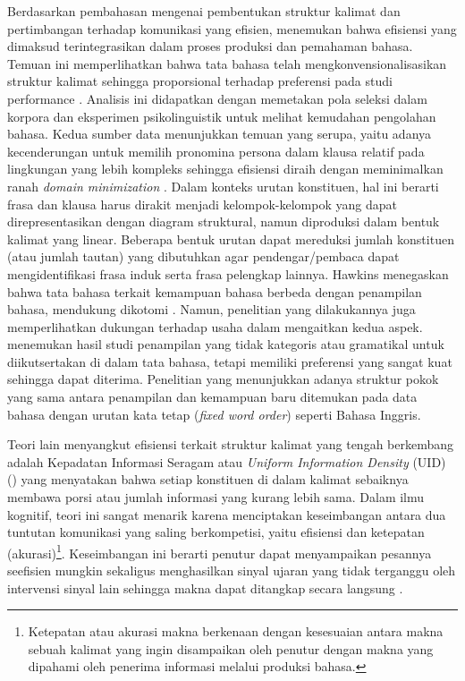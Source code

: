 Berdasarkan pembahasan mengenai pembentukan struktur kalimat dan pertimbangan terhadap komunikasi yang efisien, \cite{hawkins2004efficiency} menemukan bahwa efisiensi yang dimaksud terintegrasikan dalam proses produksi dan pemahaman bahasa. Temuan ini memperlihatkan bahwa tata bahasa telah mengkonvensionalisasikan struktur kalimat sehingga proporsional terhadap preferensi pada studi performance \citep{hawkins2004efficiency}. Analisis ini didapatkan dengan memetakan pola seleksi dalam korpora dan eksperimen psikolinguistik untuk melihat kemudahan pengolahan bahasa. Kedua sumber data menunjukkan temuan yang serupa, yaitu adanya kecenderungan untuk memilih pronomina persona dalam klausa relatif pada lingkungan yang lebih kompleks sehingga efisiensi diraih dengan meminimalkan ranah \textit{domain minimization} \citep{hawkins2004efficiency}. Dalam konteks urutan konstituen, hal ini berarti frasa dan klausa harus dirakit menjadi kelompok-kelompok yang dapat direpresentasikan dengan diagram struktural, namun diproduksi dalam bentuk kalimat yang linear. Beberapa bentuk urutan dapat mereduksi jumlah konstituen (atau jumlah tautan) yang dibutuhkan agar pendengar/pembaca dapat mengidentifikasi frasa induk serta frasa pelengkap lainnya. Hawkins menegaskan bahwa tata bahasa terkait kemampuan bahasa berbeda dengan penampilan bahasa, mendukung dikotomi \cite{chomsky1965syntactic}. Namun, penelitian yang dilakukannya juga memperlihatkan dukungan terhadap usaha dalam mengaitkan kedua aspek. \cite{hawkins2004efficiency} menemukan hasil studi penampilan yang tidak kategoris atau gramatikal untuk diikutsertakan di dalam tata bahasa, tetapi memiliki preferensi yang sangat kuat sehingga dapat diterima. Penelitian \cite{hawkins2004efficiency} yang menunjukkan adanya struktur pokok yang sama antara penampilan dan kemampuan baru ditemukan pada data bahasa dengan urutan kata tetap (\textit{fixed word order}) seperti Bahasa Inggris. 

Teori lain menyangkut efisiensi terkait struktur kalimat yang tengah berkembang adalah Kepadatan Informasi Seragam atau \textit{Uniform Information Density} (UID) (\citealp{jaeger2007speakers, frank2008speaking}) yang menyatakan bahwa setiap konstituen di dalam kalimat  sebaiknya membawa porsi atau jumlah informasi yang kurang lebih sama. Dalam ilmu kognitif, teori ini sangat menarik karena menciptakan keseimbangan antara dua tuntutan komunikasi yang saling berkompetisi, yaitu efisiensi dan ketepatan (akurasi)\footnote{Ketepatan atau akurasi makna berkenaan dengan kesesuaian antara makna sebuah kalimat yang ingin disampaikan oleh penutur dengan makna yang dipahami oleh penerima informasi melalui produksi bahasa.}. Keseimbangan ini berarti penutur dapat menyampaikan pesannya seefisien mungkin sekaligus menghasilkan sinyal ujaran yang tidak terganggu oleh intervensi sinyal lain sehingga makna dapat ditangkap secara langsung \citep{jaeger2007speakers}.

